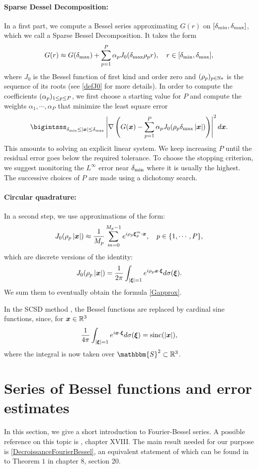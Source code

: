 \documentclass{article}
\begin{document}
\paragraph{Sparse Dessel Decomposition:} In a first part, we compute a Bessel series approximating $G(r)$ on $[\delta_{\min},\delta_{\max}]$, which we call a Sparse Bessel Decomposition. It takes the form
\[G(r) \approx G(\delta_{\max}) + \sum_{p=1}^P \alpha_p J_0(\delta_{\max} \rho_p r), \quad r \in [\delta_{\min},\delta_{\max}],\]
where $J_0$ is the Bessel function of first kind and order zero and $(\rho_p)_{p \in \mathbb{N}*}$ is the sequence of its roots (see \autoref{defJ0} for more details). In order to compute the coefficients $(\alpha_{p})_{1 \leq p \leq P}$, we first choose a starting value for $P$ and compute the weights $\alpha_1,\cdots, \alpha_{P}$ that minimize the least square error
\[\bigintsss_{\rmin \leq |\bs{x}|\leq \rmax} \abs{\nabla \left(G(\bs{x}) - \sum_{p=1}^P \alpha_p J_0(\rho_p \rmax \abs{\bs{x}})\right)}^2 d\bs{x}.\]
This amounts to solving an explicit linear system. We keep increasing $P$ until the residual error goes below the required tolerance. To choose the stopping criterion, we suggest monitoring the $L^{\infty}$ error near $\delta_{\min}$ where it is usually the highest. The successive choices of $P$ are made using a dichotomy search. 
\paragraph{Circular quadrature:}In a second step, we use approximations of the form:
\[J_0(\rho_p \left\lvert \boldsymbol{x} \right\rvert) \approx \dfrac{1}{M_p}\sum_{m=0}^{M_p-1}e^{i \rho_p \boldsymbol{\xi}_p^m \cdot \boldsymbol{x}}, \quad p \in \{1,\cdots,P\},\]
which are discrete versions of the identity:
\[ J_0(\rho_p\left\lvert \boldsymbol{x} \right\rvert) = \frac{1}{2\pi}\int_{\left\lvert \boldsymbol{\xi} \right\rvert=1}{e^{i \rho_p\boldsymbol{x} \cdot \boldsymbol{\xi}}} d\sigma(\boldsymbol{\xi}).\]
We sum them to eventually obtain the formula \eqref{Gapprox}. 
\begin{Remark}
	In the SCSD method \cite{Alouges2015}, the Bessel functions are replaced by cardinal sine functions, since, for $\boldsymbol{x} \in \mathbb{R}^3$
	\[ \frac{1}{4\pi}\int_{\left\lvert \boldsymbol{\xi} \right\rvert=1} e^{i \boldsymbol{x}\cdot \boldsymbol{\xi}} d\sigma(\boldsymbol{\xi}) = \textup{sinc}(\left\lvert \boldsymbol{x} \right\rvert),\]
	where the integral is now taken over $\mathbbm{S}^2 \subset \R^3$.
\end{Remark}



\section{Series of Bessel functions and error estimates}
\label{sec:FourierBesselSeries}
In this section, we give a short introduction to Fourier-Bessel series. A possible reference on this topic is \cite{watson1995treatise}, chapter XVIII. 
The main result needed for our purpose is \autoref{DecroissanceFourierBessel},  an equivalent statement of which can be found in to Theorem $1$ in \cite{tolstov2012fourier} chapter 8, section 20. 
\end{document}
